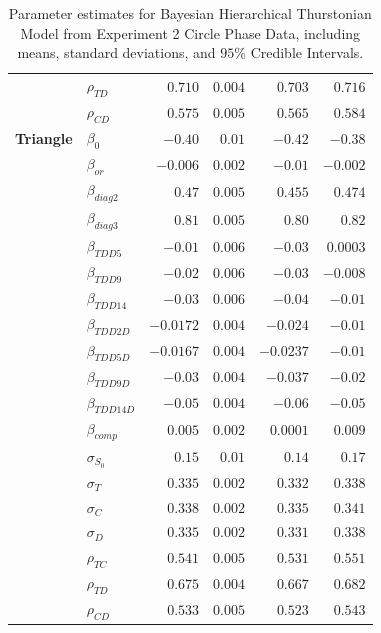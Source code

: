 \begin{table}[ht]
\begin{tabular}{llrrrr}
                    &  $\rho_{TD}$     &    $0.710$   &   $0.004$   &  $0.703$     & $0.716$     \\
                    &  $\rho_{CD}$     &    $0.575$   &   $0.005$   &  $0.565$     & $0.584$     \\
        \textbf{Triangle}    &  $\beta_{0}$     &    $-0.40$   &   $0.01$    &  $-0.42$     & $-0.38$     \\
                    &  $\beta_{or}$    &    $-0.006$  &   $0.002$   &  $-0.01$     & $-0.002$    \\
                    &  $\beta_{diag2}$ &    $0.47$    &   $0.005$   &  $0.455$     & $0.474$     \\
                    &  $\beta_{diag3}$ &    $0.81$    &   $0.005$   &  $0.80$      & $0.82$      \\
                    &  $\beta_{TDD5}$  &    $-0.01$   &   $0.006$   &  $-0.03$     & $0.0003$    \\
                    &  $\beta_{TDD9}$  &    $-0.02$   &   $0.006$   &  $-0.03$     & $-0.008$    \\
                    &  $\beta_{TDD14}$ &    $-0.03$   &   $0.006$   &  $-0.04$     & $-0.01$     \\
                    &  $\beta_{TDD2D}$ &    $-0.0172$ &   $0.004$   &  $-0.024$    & $-0.01$     \\
                    &  $\beta_{TDD5D}$ &    $-0.0167$ &   $0.004$   &  $-0.0237$   & $-0.01$     \\
                    &  $\beta_{TDD9D}$ &    $-0.03$   &   $0.004$   &  $-0.037$    & $-0.02$     \\
                    &  $\beta_{TDD14D}$&    $-0.05$   &   $0.004$   &  $-0.06$     & $-0.05$     \\
                    &  $\beta_{comp}$  &    $0.005$   &   $0.002$   &  $0.0001$    & $0.009$     \\
                    &  $\sigma_{S_0}$  &    $0.15$    &   $0.01$    &  $0.14$      & $0.17$      \\
                    &  $\sigma_{T}$    &    $0.335$   &   $0.002$   &  $0.332$     & $0.338$     \\
                    &  $\sigma_{C}$    &    $0.338$   &   $0.002$   &  $0.335$     & $0.341$     \\
                    &  $\sigma_{D}$    &    $0.335$   &   $0.002$   &  $0.331$     & $0.338$     \\
                    &  $\rho_{TC}$     &    $0.541$   &   $0.005$   &  $0.531$     & $0.551$     \\
                    &  $\rho_{TD}$     &    $0.675$   &   $0.004$   &  $0.667$     & $0.682$     \\
                    &  $\rho_{CD}$     &    $0.533$   &   $0.005$   &  $0.523$     & $0.543$     \\
        \bottomrule
    \end{tabular}
    \caption{Parameter estimates for Bayesian Hierarchical Thurstonian Model from Experiment 2 Circle Phase Data, including means, standard deviations, and $95\%$ Credible Intervals.}
    \label{tab:e2_params}
\end{table}

